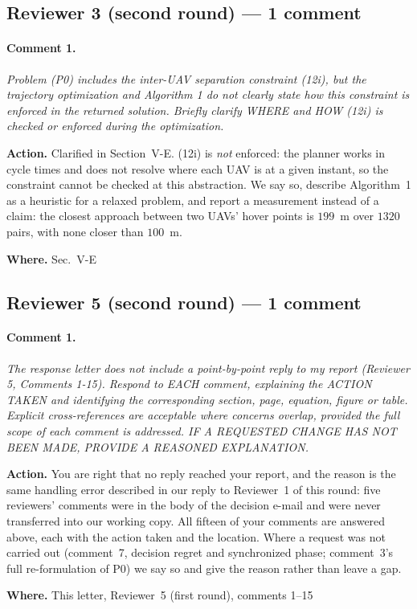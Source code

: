 \documentclass[10pt]{article}
\newcommand{\rev}[1]{\par\medskip\noindent\textit{#1}\par\smallskip}
\newcommand{\act}[2]{\noindent\textbf{Action.} #1\par\noindent\textbf{Where.} #2\par}
\begin{document}
\subsection*{Reviewer 3 (second round) --- 1 comment}

\paragraph{Comment 1.}
\rev{Problem (P0) includes the inter-UAV separation constraint (12i), but the trajectory optimization and Algorithm 1 do not clearly state how this constraint is enforced in the returned solution. Briefly clarify WHERE and HOW (12i) is checked or enforced during the optimization.}
\act{Clarified in Section~V-E. (12i) is \emph{not} enforced: the planner works in cycle times and does not resolve where each UAV is at a given instant, so the constraint cannot be checked at this abstraction. We say so, describe Algorithm~1 as a heuristic for a relaxed problem, and report a measurement instead of a claim: the closest approach between two UAVs' hover points is $199$~m over $1320$ pairs, with none closer than $100$~m.}{Sec.~V-E}

\subsection*{Reviewer 5 (second round) --- 1 comment}

\paragraph{Comment 1.}
\rev{The response letter does not include a point-by-point reply to my report (Reviewer 5, Comments 1-15). Respond to EACH comment, explaining the ACTION TAKEN and identifying the corresponding section, page, equation, figure or table. Explicit cross-references are acceptable where concerns overlap, provided the full scope of each comment is addressed. IF A REQUESTED CHANGE HAS NOT BEEN MADE, PROVIDE A REASONED EXPLANATION.}
\act{You are right that no reply reached your report, and the reason is the same handling error described in our reply to Reviewer~1 of this round: five reviewers' comments were in the body of the decision e-mail and were never transferred into our working copy. All fifteen of your comments are answered above, each with the action taken and the location. Where a request was not carried out (comment~7, decision regret and synchronized phase; comment~3's full re-formulation of P0) we say so and give the reason rather than leave a gap.}{This letter, Reviewer~5 (first round), comments 1--15}
\end{document}
